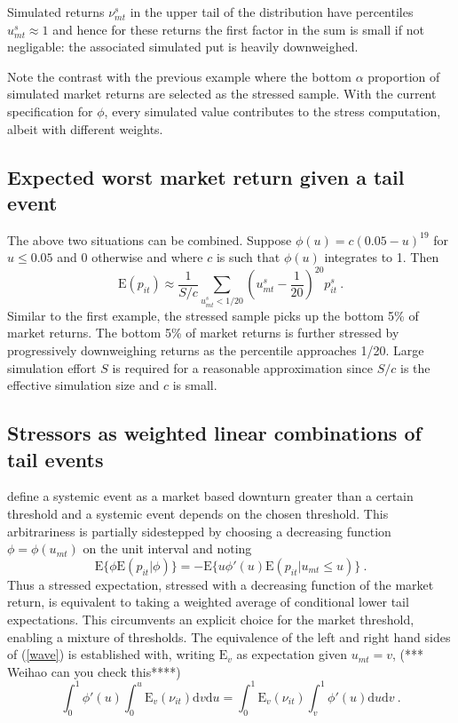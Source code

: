 \documentclass[authoryear]{elsarticle}
\newcommand{\E}{\mathrm{E}}
\newcommand{\de}{\mathrm{d}}
\newcommand{\eref}[1]{(\ref{#1})}
\newcommand{\be}[1]{\begin{equation}\label{#1}}
\newcommand{\ee}{\end{equation}}
\begin{document}
Simulated returns $\nu^s_{mt}$ in the upper tail of the distribution  have percentiles $u^s_{mt}\approx 1$ and hence for these returns the first factor in the sum is  small if not negligable: the associated simulated put  is heavily downweighed.

Note the contrast with the previous example where the bottom $\alpha$ proportion of simulated market returns are selected as the stressed sample. With the current specification for $\phi$,   every simulated value contributes to the stress computation, albeit with  different weights.


\subsection{Expected worst market return given a tail event}

The above two situations can be combined.   Suppose  $\phi(u)=c(0.05-u)^{19}$ for $u\le 0.05$ and 0 otherwise and where $c$ is such that $\phi(u)$ integrates to 1.  Then
$$
\E(p_{it}) \approx \frac{1}{S/c}\sum_{u^s_{mt}<1/20}  \left(u^s_{mt}-\frac{1}{20}\right)^{20}p_{it}^s\ .
$$
 Similar to the first example, the stressed sample picks up the bottom 5\% of market returns. The bottom 5\% of market returns is further stressed by  progressively downweighing returns as the percentile approaches 1/20.   Large simulation effort $S$ is required for a reasonable approximation since $S/c$ is the effective simulation size and $c$ is small.
 
 \subsection{Stressors as  weighted linear combinations of tail events}

\cite{brownlees2015} define a systemic event as a market based downturn greater than a certain threshold and a systemic event  depends on the chosen threshold.   This arbitrariness is partially sidestepped by choosing a decreasing function $\phi=\phi(u_{mt})$ on the unit interval and noting 
\be{wave}
\E\{\phi\E(p_{it}|\phi)\} = -\E\{u\phi'(u)\E(p_{it}|u_{mt}\le u)\}\ .
\ee
Thus a stressed expectation, stressed with a decreasing function of the market return, is equivalent to taking a weighted average of conditional lower tail expectations.  This circumvents an explicit choice for the market threshold, enabling a mixture of thresholds.  The equivalence of the left and right hand sides of \eref{wave}  is established with, writing $\E_v$ as expectation given $u_{mt}=v$,  (*** Weihao can you check this****)
$$
\int_0^1 \phi'(u)  \int_0^u \E_v(\nu_{it})\de v   \de u =\int_0^1\E_v(\nu_{it})\int_v^1  \phi'(u) \de u \de v\ .   
$$
\end{document}

